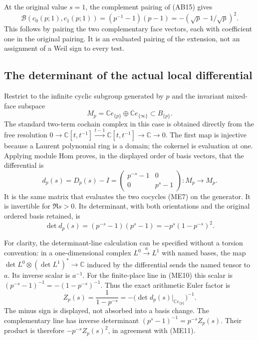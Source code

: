 \documentclass[11pt,a4paper]{article}
\theoremstyle{definition}\newtheorem{definition}[theorem]{Definition}
\newcommand{\C}{\mathbb C}\newcommand{\R}{\mathbb R}
\begin{document}
At the original value $s=1$, the complement pairing of (AB15) gives
\[
 \mathscr B(c_0(p;1),c_1(p;1))
 =(p^{-1}-1)(p-1)=-(\sqrt p-1/\sqrt p)^2.
 \tag{ME8}
\]
This follows by pairing the two complementary face vectors, each with
coefficient one in the original pairing. It is an evaluated pairing of
the extension, not an assignment of a Weil sign to every test.

\subsection{The determinant of the actual local differential}
Restrict to the infinite cyclic subgroup generated by $p$ and the
invariant mixed-face subspace
\[
 M_p=\C e_{\{p\}}\oplus\C e_{\{\infty\}}\subset B_{\{p\}}.
 \tag{ME9}
\]
The standard two-term cochain complex in this case is obtained directly
from the free resolution
$0\to\C[t,t^{-1}]\xrightarrow{t-1}\C[t,t^{-1}]\to\C\to0$.
The first map is injective because a Laurent polynomial ring is a domain;
the cokernel is evaluation at one. Applying module Hom proves, in the
displayed order of basis vectors, that the differential is
\[
 d_p(s)=D_p(s)-I=
 \begin{pmatrix}p^{-s}-1&0\\0&p^s-1\end{pmatrix}:
 M_p\longrightarrow M_p.
 \tag{ME10}\label{eq:ME-differential}
\]
It is the same matrix that evaluates the two cocycles (ME7) on the
generator. It is invertible for $\Re s>0$. Its determinant, with both
orientations and the original ordered basis retained, is
\[
 \det d_p(s)=(p^{-s}-1)(p^s-1)
 =-p^s(1-p^{-s})^2.
 \tag{ME11}
\]

For clarity, the determinant-line calculation can be specified without a
torsion convention: in a one-dimensional complex
$L^0\xrightarrow{a}L^1$ with named bases, the map
$\det L^0\otimes(\det L^1)^*\to\C$ induced by the differential
sends the named tensor to $a$. Its inverse scalar is $a^{-1}$.
For the finite-place line in (ME10) this scalar is
$(p^{-s}-1)^{-1}=-(1-p^{-s})^{-1}$. Thus the exact arithmetic Euler
factor is
\[
 Z_p(s)=\frac1{1-p^{-s}}
 =-\bigl(\det d_p(s)|_{\C e_{\{p\}}}\bigr)^{-1}.
 \tag{ME12}\label{eq:ME-euler-torsion}
\]
The minus sign is displayed, not absorbed into a basis change. The
complementary line has inverse determinant
$(p^s-1)^{-1}=p^{-s}Z_p(s)$. Their product is therefore
$-p^{-s}Z_p(s)^2$, in agreement with (ME11).
\end{document}
